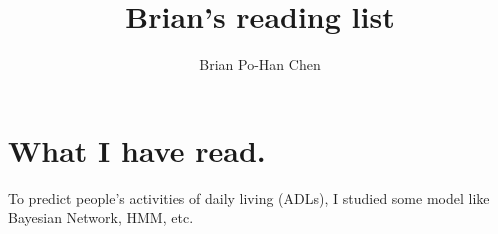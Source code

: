 \documentclass[a4paper]{article}
\title{\textbf{Brian's reading list}}
\author{Brian Po-Han Chen}
\begin{document}
\maketitle

\section{What I have read.}
To predict people's activities of daily living (ADLs)\cite{Nazerfard:AAAI13,Nazerfard:AIHC15}, I studied some model like Bayesian Network\cite{Rish:IBMR00,Nazerfard:Slides11,Russell:AI10}, HMM\cite{Fosler-Lussier:ICSI98}, etc.


 

\end{document}
